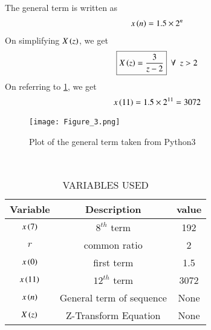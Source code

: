 \documentclass[journal,12pt,twocolumn]{IEEEtran}
\theoremstyle{remark}
\begin{document}
The general term is written as
\begin{align}
    x\left(n\right)=1.5\times2^{n}
\end{align}
On simplifying $X\left(z\right)$, we get
\begin{align}
   \boxed{X\left(z\right)=\dfrac{3}{z-2}}\,\,\, \forall \,\,\, z>2
\end{align}
On referring to \ref{table 11.9.3.2.1}, we get
\begin{align}
x\left(11\right) = 1.5\times2^{11} = 3072
\end{align}
\begin{figure}[h]
\renewcommand\thefigure{1} 
    \centering
    \texttt{[image: Figure\_3.png]}
    \caption{Plot of the general term taken from Python3}
    \label{fig:1}
\end{figure}\\
\begin{table}[ht]
\renewcommand\thetable{1}
    \centering
    \begin{tabular}{|c|c|c|}
    \hline
        Variable&             Description&value\\\hline
     $x\left(7\right)$&           $8^{th}$ term&192  \\\hline
             $r$&            common ratio&2    \\\hline
     $x\left(0\right)$&              first term&1.5  \\\hline
    $x\left(11\right)$&          $12^{th}$ term&3072 \\\hline
     $x\left(n\right)$&General term of sequence&None \\\hline
     $X\left(z\right)$&    Z-Transform Equation&None \\\hline
    \end{tabular}
    \vspace{0.3cm}
    \caption{VARIABLES USED}
    \label{table 11.9.3.2.1}
\end{table}
\end{document}
